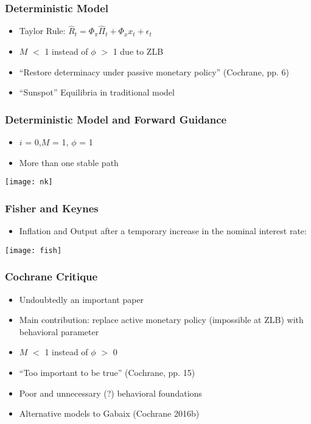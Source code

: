 \documentclass{beamer}
\begin{document}
 
 \begin{frame}
\frametitle{Deterministic Model}
\begin{itemize}
\item Taylor Rule: $\hat{R}_{t}=\Phi_{\pi}\hat{\Pi}_{t}+\Phi_{x}x_{t}+\epsilon_{t}$
\item $M$ $<$ 1 instead of $\phi$ $>$ 1 due to ZLB
\item “Restore determinacy under passive monetary policy” (Cochrane, pp. 6)
\item “Sunspot” Equilibria in traditional model
\end{itemize}
\end{frame}

 
\begin{frame}
\frametitle{Deterministic Model and Forward Guidance}
\begin{itemize}
\item $i$ = 0,$ M$ = 1, $\phi$ = 1
\item More than one stable path
\end{itemize}
\texttt{[image: nk]}
\end{frame}

 
\begin{frame}
\frametitle{Fisher and Keynes}
\begin{itemize}
\item Inflation and Output after a temporary increase in the nominal interest rate:
\end{itemize}
\texttt{[image: fish]}
\end{frame}


\begin{frame}
\frametitle{Cochrane Critique}
\begin{itemize}
\item Undoubtedly an important paper
\item Main contribution: replace active monetary policy (impossible at ZLB) with behavioral parameter
\item $M$ $<$ 1 instead of $\phi$ $>$ 0
\item “Too important to be true” (Cochrane, pp. 15)
\item Poor and unnecessary (?) behavioral foundations
\item Alternative models to Gabaix (Cochrane 2016b)
\end{itemize}
\end{frame}
\end{document}
